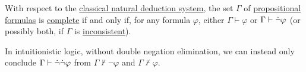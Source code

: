 \begin{proposition}\label{thm:propositional_complete_set}
  With respect to the \hyperref[def:propositional_natural_deduction_systems]{classical natural deduction system}, the set \( \Gamma \) of \hyperref[def:propositional_syntax/formula]{propositional formulas} is \hyperref[def:complete_set_of_sentences]{complete} if and only if, for any formula \( \varphi \), either \( \Gamma \vdash \varphi \) or \( \Gamma \vdash \dot\neg \varphi \) (or possibly both, if \( \Gamma \) is \hyperref[def:consistent_set_of_sentences]{inconsistent}).
\end{proposition}
\begin{comments}
  \item In intuitionistic logic, without double negation elimination, we can instead only conclude \( \Gamma \vdash \dot\neg \dot\neg \varphi \) from \( \Gamma \not\vdash \neg \varphi \) and \( \Gamma \not\vdash \varphi \).
\end{comments}
